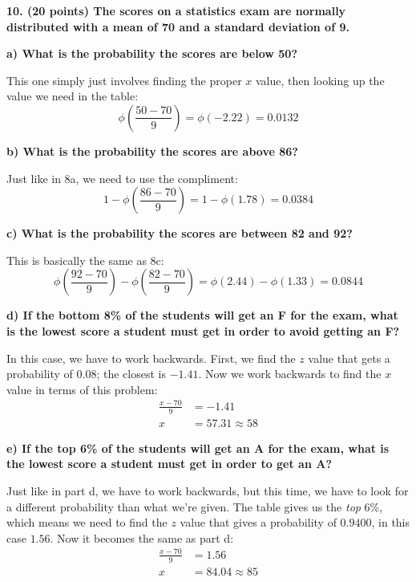\documentclass[12pt, letter]{article}
\begin{document}
\textbf{10. (20 points) The scores on a statistics exam are normally distributed with a mean of 70 and a standard deviation of 9.}

\pagebreak

\qquad \textbf{a) What is the probability the scores are below 50?}
\begin{center}
	This one simply just involves finding the proper $x$ value, then looking up the value we need in the table:
	$$\phi\left(\frac{50 - 70}{9}\right) = \phi(-2.22) = \boxed{0.0132}$$
\end{center}

\qquad \textbf{b) What is the probability the scores are above 86?}
\begin{center}
	Just like in 8a, we need to use the compliment:
	$$1 - \phi\left(\frac{86 - 70}{9}\right) = 1 - \phi(1.78) = \boxed{0.0384}$$
\end{center}

\qquad \textbf{c) What is the probability the scores are between 82 and 92?}
\begin{center}
	This is basically the same as 8c:
	$$\phi\left(\frac{92 - 70}{9}\right) - \phi\left(\frac{82 - 70}{9}\right) = \phi(2.44) - \phi(1.33) = \boxed{0.0844}$$
\end{center}

\qquad \textbf{d) If the bottom 8\% of the students will get an F for the exam, what is the lowest score a student must get in order to avoid getting an F?}
\begin{center}
	In this case, we have to work backwards. First, we find the $z$ value that gets a probability of 0.08; the closest is $-1.41$. Now we work backwards to find the $x$ value in terms of this problem:
	\begin{align*}
		\frac{x - 70}{9} &= -1.41 \\
		x &= 57.31 \approx \boxed{58}
	\end{align*}
\end{center}

\qquad \textbf{e) If the top 6\% of the students will get an A for the exam, what is the lowest score a student must get in order to get an A?}
\begin{center}
	Just like in part d, we have to work backwards, but this time, we have to look for a different probability than what we're given. The table gives us the \textit{top} 6\%, which means we need to find the $z$ value that gives a probability of $0.9400$, in this case $1.56$. Now it becomes the same as part d:
	\begin{align*}
		\frac{x - 70}{9} &= 1.56 \\
		x &= 84.04 \approx \boxed{85}
	\end{align*}
\end{center}
\end{document}
